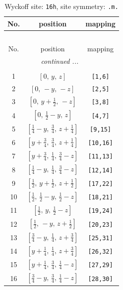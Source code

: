 \documentclass[fleqn,8pt]{jsarticle}
\begin{document}
\renewcommand{\arraystretch}{1.2}
\begin{longtable}{ccc}
\caption{Wyckoff site: {\tt 16h}, site symmetry: {\tt .m.}}
 \\
 \hline \hline
No. & position & mapping \\ \hline \endfirsthead

\multicolumn{2}{l}{\tablename\ \thetable{}} \\
 \hline \hline
No. & position & mapping \\ \hline \endhead

 \hline \hline
\multicolumn{2}{r}{\footnotesize\it continued ...} \\ \endfoot

 \hline \hline
\multicolumn{2}{r}{} \\ \endlastfoot

1 & $\left[ 0,\, y,\, z \right]$ & {\tt [1,6]} \\ \hline
2 & $\left[ 0,\, - y,\, - z \right]$ & {\tt [2,5]} \\ \hline
3 & $\left[ 0,\, y + \frac{1}{2},\, - z \right]$ & {\tt [3,8]} \\ \hline
4 & $\left[ 0,\, \frac{1}{2} - y,\, z \right]$ & {\tt [4,7]} \\ \hline
5 & $\left[ \frac{1}{4} - y,\, \frac{3}{4},\, z + \frac{1}{4} \right]$ & {\tt [9,15]} \\ \hline
6 & $\left[ y + \frac{3}{4},\, \frac{3}{4},\, z + \frac{1}{4} \right]$ & {\tt [10,16]} \\ \hline
7 & $\left[ y + \frac{3}{4},\, \frac{1}{4},\, \frac{3}{4} - z \right]$ & {\tt [11,13]} \\ \hline
8 & $\left[ \frac{1}{4} - y,\, \frac{1}{4},\, \frac{3}{4} - z \right]$ & {\tt [12,14]} \\ \hline
9 & $\left[ \frac{1}{2},\, y + \frac{1}{2},\, z + \frac{1}{2} \right]$ & {\tt [17,22]} \\ \hline
10 & $\left[ \frac{1}{2},\, \frac{1}{2} - y,\, \frac{1}{2} - z \right]$ & {\tt [18,21]} \\ \hline
11 & $\left[ \frac{1}{2},\, y,\, \frac{1}{2} - z \right]$ & {\tt [19,24]} \\ \hline
12 & $\left[ \frac{1}{2},\, - y,\, z + \frac{1}{2} \right]$ & {\tt [20,23]} \\ \hline
13 & $\left[ \frac{3}{4} - y,\, \frac{1}{4},\, z + \frac{3}{4} \right]$ & {\tt [25,31]} \\ \hline
14 & $\left[ y + \frac{1}{4},\, \frac{1}{4},\, z + \frac{3}{4} \right]$ & {\tt [26,32]} \\ \hline
15 & $\left[ y + \frac{1}{4},\, \frac{3}{4},\, \frac{1}{4} - z \right]$ & {\tt [27,29]} \\ \hline
16 & $\left[ \frac{3}{4} - y,\, \frac{3}{4},\, \frac{1}{4} - z \right]$ & {\tt [28,30]} \\
\end{longtable}
\end{document}
